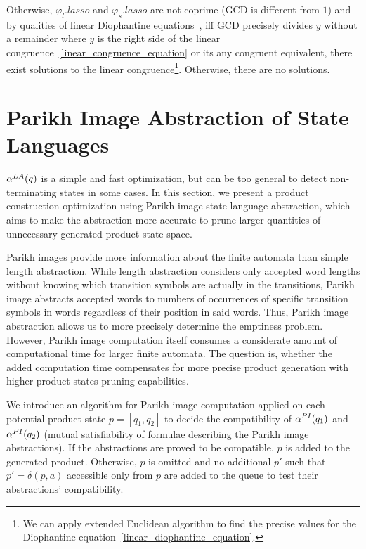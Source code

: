 Otherwise, $\varphi_l.lasso$ and $\varphi_s.lasso$ are not coprime (GCD is different from $1$) and by qualities of linear Diophantine equations~\cite{LinearCongruences}, iff GCD precisely divides $y$ without a remainder where $y$ is the right side of the linear congruence~\ref{linear_congruence_equation} or its any congruent equivalent, there exist solutions to the linear congruence\footnote{We can apply extended Euclidean algorithm to find the precise values for the Diophantine equation~\ref{linear_diophantine_equation}.}. Otherwise, there are no solutions.

\section{Parikh Image Abstraction of State Languages}

$\alpha^{LA}(q)$ is a simple and fast optimization, but can be too general to detect non-terminating states in some cases. In this section, we present a product construction optimization using Parikh image state language abstraction, which aims to make the abstraction more accurate to prune larger quantities of unnecessary generated product state space.

Parikh images provide more information about the finite automata than simple length abstraction. While length abstraction considers only accepted word lengths without knowing which transition symbols are actually in the transitions, Parikh image abstracts accepted words to numbers of occurrences of specific transition symbols in words regardless of their position in said words. Thus, Parikh image abstraction allows us to more precisely determine the emptiness problem. However, Parikh image computation itself consumes a considerate amount of computational time for larger finite automata. The question is, whether the added computation time compensates for more precise product generation with higher product states pruning capabilities.

We introduce an algorithm for Parikh image computation applied on each potential product state $p = [q_1, q_2]$ to decide the compatibility of $\alpha^{PI}(q_1)$ and $\alpha^{PI}(q_2)$ (mutual satisfiability of formulae describing the Parikh image abstractions). If the abstractions are proved to be compatible, $p$ is added to the generated product. Otherwise, $p$ is omitted and no additional $p'$ such that $p' = \delta(p, a)$ accessible only from $p$ are added to the queue to test their abstractions' compatibility.

